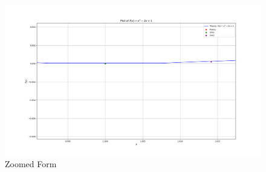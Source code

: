 \documentclass[journal]{IEEEtran}
\begin{document}
\begin{enumerate}
\begin{figure}[htbp]
          \centering
        \includegraphics[width=\textwidth]{fig/Figure_2.png} %
        \caption{Zoomed Form}
        \label{fig:fig2}
   \end{figure}


\end{enumerate}
\end{document}
